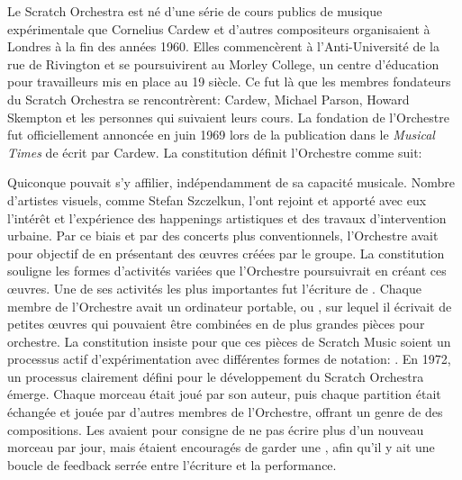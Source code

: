 {


Le Scratch Orchestra est n\'e d'une s\'erie de cours publics de musique
exp\'erimentale que Cornelius Cardew et d'autres compositeurs
organisaient \`a Londres \`a la fin des ann\'ees 1960. Elles
commenc\`erent \`a l'Anti{}-Universit\'e de la rue de Rivington et se
poursuivirent au Morley College, un centre d'\'education pour
travailleurs mis en place au 19 si\`ecle. Ce fut
l\`a que les membres fondateurs du Scratch Orchestra se
rencontr\`erent: Cardew, Michael Parson, Howard Skempton et les
personnes qui suivaient leurs cours. La fondation de l'Orchestre fut
officiellement annonc\'ee en juin 1969 lors de la publication dans le
{\em Musical Times} de  \'ecrit par Cardew. La constitution d\'efinit l'Orchestre
comme suit:


Quiconque pouvait s'y affilier, ind\'ependamment de sa capacit\'e
musicale. Nombre d'artistes visuels, comme Stefan Szczelkun, l'ont
rejoint et apport\'e avec eux l'int\'er\^et et l'exp\'erience des
happenings artistiques et des travaux d'intervention urbaine. Par ce
biais et par des concerts plus conventionnels, l'Orchestre avait pour
objectif de  en pr\'esentant des
{\oe}uvres cr\'e\'ees par le groupe. La constitution souligne les formes
d'activit\'es vari\'ees que l'Orchestre poursuivrait en cr\'eant ces
{\oe}uvres. Une de ses activit\'es les plus importantes fut l'\'ecriture
de . Chaque membre de l'Orchestre avait un ordinateur
portable, ou , sur lequel il \'ecrivait de petites {\oe}uvres
qui pouvaient \^etre combin\'ees en de plus grandes pi\`eces pour
orchestre. La constitution insiste pour que ces pi\`eces de Scratch
Music soient un processus actif d'exp\'erimentation avec diff\'erentes
formes de notation: . En
1972, un processus clairement d\'efini pour le d\'eveloppement du
Scratch Orchestra \'emerge. Chaque morceau \'etait jou\'e par son
auteur, puis chaque partition \'etait \'echang\'ee et jou\'ee par
d'autres membres de l'Orchestre, offrant un genre de  des compositions. Les  avaient pour consigne de ne
pas \'ecrire plus d'un nouveau morceau par jour, mais \'etaient
encourag\'es de garder une , afin qu'il y ait
une boucle de feedback serr\'ee entre l'\'ecriture et la performance.

}
